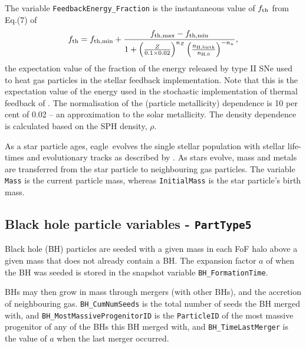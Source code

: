 \documentclass[10pt, a4paper]{article}
\newcommand{\eagle}{{\sc eagle}}
\begin{document}
The variable \texttt{FeedbackEnergy\_Fraction} is the instantaneous value of $f_{\rm th}$ from Eq.(7) of \cite{2015MNRAS.446..521S}
\begin{equation}
f_{\rm th} = f_{\rm th,min} + \frac{f_{\rm th,max} - f_{\rm th,min}}
{1 + \left (\frac{Z}{0.1\times 0.02}\right )^{n_Z} \left (\frac{n_{\rm H,birth}}{n_{{\rm H},0}}\right )^{-n_n}},
\label{EqfZn}
\end{equation} 
the expectation value of the fraction of the energy released by type II SNe used to heat gas particles in the stellar feedback implementation. Note that this is the expectation value of the energy used in the stochastic implementation of thermal feedback of \cite{2012MNRAS.426..140D}. The normalisation of the (particle metallicity) dependence is 10 per cent of 0.02 -- an approximation to the solar metallicity. The density dependence is calculated based on the SPH density, $\rho$.

As a star particle ages, \eagle\ evolves the single stellar population with stellar life-times and evolutionary tracks as described by \cite{2009MNRAS.399..574W}. As stars evolve, mass and metals are transferred from the star particle to neighbouring gas particles. The variable \texttt{Mass} is the current particle mass, whereas \texttt{InitialMass} is the star particle's birth mass.

\subsection{Black hole particle variables - \texttt{PartType5}}
\label{SecBH}
Black hole (BH) particles are seeded with a given mass in each FoF halo above a given mass that does not already contain a BH. The expansion factor $a$ of when the BH was seeded is stored in the snapshot variable \texttt{BH\_FormationTime}.

BHs may then grow in mass through mergers (with other BHs), and the accretion of neighbouring gas.  \texttt{BH\_CumNumSeeds} is the total number of seeds the BH merged with, and \texttt{BH\_MostMassiveProgenitorID} is the \texttt{ParticleID} of the most massive progenitor of any of the BHs this BH merged with, and \texttt{BH\_TimeLastMerger} is the value of $a$ when the last merger occurred.
\end{document}
